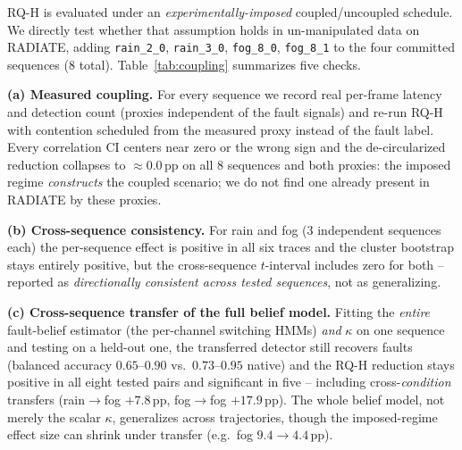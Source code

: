 \documentclass[conference]{IEEEtran}
\begin{document}
RQ-H is evaluated under an \emph{experimentally-imposed}
coupled/uncoupled schedule. We directly test whether that assumption
holds in un-manipulated data on RADIATE, adding \texttt{rain\_2\_0},
\texttt{rain\_3\_0}, \texttt{fog\_8\_0}, \texttt{fog\_8\_1} to the
four committed sequences (8 total). Table~\ref{tab:coupling}
summarizes five checks.

\textbf{(a) Measured coupling.} For every sequence we record real
per-frame latency and detection count (proxies independent of the
fault signals) and re-run RQ-H with contention scheduled from the
measured proxy instead of the fault label. Every correlation CI
centers near zero or the wrong sign and the de-circularized reduction
collapses to $\approx0.0$\,pp on all 8 sequences and both proxies:
the imposed regime \emph{constructs} the coupled scenario; we do not
find one already present in RADIATE by these proxies.

\textbf{(b) Cross-sequence consistency.} For rain and fog (3
independent sequences each) the per-sequence effect is positive in
all six traces and the cluster bootstrap stays entirely positive, but
the cross-sequence $t$-interval includes zero for both -- reported as
\emph{directionally consistent across tested sequences}, not as
generalizing.

\textbf{(c) Cross-sequence transfer of the full belief model.}
Fitting the \emph{entire} fault-belief estimator (the per-channel
switching HMMs) \emph{and} $\kappa$ on one sequence and testing on a
held-out one, the transferred detector still recovers faults
(balanced accuracy $0.65$--$0.90$ vs.\ $0.73$--$0.95$ native) and the
RQ-H reduction stays positive in all eight tested pairs and
significant in five -- including cross-\emph{condition} transfers
(rain$\rightarrow$fog $+7.8$\,pp, fog$\rightarrow$fog $+17.9$\,pp).
The whole belief model, not merely the scalar $\kappa$, generalizes
across trajectories, though the imposed-regime effect size can shrink
under transfer (e.g.\ fog $9.4\rightarrow4.4$\,pp).
\end{document}

